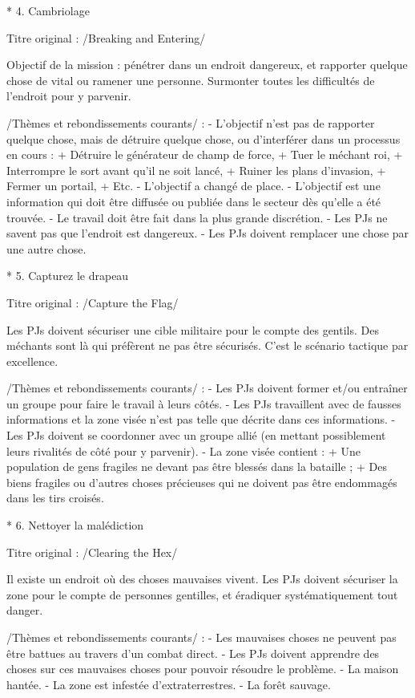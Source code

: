 \begin{enumerate}
* 4. Cambriolage

Titre original : /Breaking and Entering/

Objectif de la mission : pénétrer dans un endroit dangereux, et rapporter quelque chose de vital ou ramener une personne. Surmonter toutes les difficultés de l'endroit pour y parvenir.

/Thèmes et rebondissements courants/ :
- L'objectif n'est pas de rapporter quelque chose, mais de détruire quelque chose, ou d'interférer dans un processus en cours :
  + Détruire le générateur de champ de force,
  + Tuer le méchant roi,
  + Interrompre le sort avant qu'il ne soit lancé,
  + Ruiner les plans d'invasion,
  + Fermer un portail,
  + Etc.
- L'objectif a changé de place.
- L'objectif est une information qui doit être diffusée ou publiée dans le secteur dès qu'elle a été trouvée.
- Le travail doit être fait dans la plus grande discrétion.
- Les PJs ne savent pas que l'endroit est dangereux.
- Les PJs doivent remplacer une chose par une autre chose.

* 5. Capturez le drapeau

Titre original : /Capture the Flag/

Les PJs doivent sécuriser une cible militaire pour le compte des gentils. Des méchants sont là qui préfèrent ne pas être sécurisés. C'est le scénario tactique par excellence.

/Thèmes et rebondissements courants/ :
- Les PJs doivent former et/ou entraîner un groupe pour faire le travail à leurs côtés.
- Les PJs travaillent avec de fausses informations et la zone visée n'est pas telle que décrite dans ces informations.
- Les PJs doivent se coordonner avec un groupe allié (en mettant possiblement leurs rivalités de côté pour y parvenir).
- La zone visée contient :
  + Une population de gens fragiles ne devant pas être blessés dans la bataille ;
  + Des biens fragiles ou d'autres choses précieuses qui ne doivent pas être endommagés dans les tirs croisés.

* 6. Nettoyer la malédiction

Titre original : /Clearing the Hex/

Il existe un endroit où des choses mauvaises vivent. Les PJs doivent sécuriser la zone pour le compte de personnes gentilles, et éradiquer systématiquement tout danger.

/Thèmes et rebondissements courants/ :
- Les mauvaises choses ne peuvent pas être battues au travers d'un combat direct.
- Les PJs doivent apprendre des choses sur ces mauvaises choses pour pouvoir résoudre le problème.
- La maison hantée.
- La zone est infestée d'extraterrestres.
- La forêt sauvage.


\end{enumerate}
